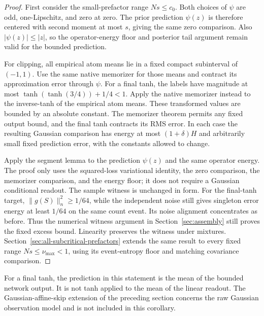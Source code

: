 \begin{proof}
First consider the small-prefactor range $Ns\le c_0$. Both choices of $\psi$ are odd, one-Lipschitz, and zero at zero. The prior prediction $\psi(z)$ is therefore centered with second moment at most $s$, giving the same zero comparison. Also $|\psi(z)|\le|z|$, so the operator-energy floor and posterior tail argument remain valid for the bounded prediction.

For clipping, all empirical atom means lie in a fixed compact subinterval of $(-1,1)$. Use the same native memorizer for those means and contract its approximation error through $\psi$. For a final tanh, the labels have magnitude at most $\tanh(\tanh(3/4))+1/4<1$. Apply the native memorizer instead to the inverse-tanh of the empirical atom means. These transformed values are bounded by an absolute constant. The memorizer theorem permits any fixed output bound, and the final tanh contracts its RMS error. In each case the resulting Gaussian comparison has energy at most $(1+\delta)H$ and arbitrarily small fixed prediction error, with the constants allowed to change.

Apply the segment lemma to the prediction $\psi(z)$ and the same operator energy. The proof only uses the squared-loss variational identity, the zero comparison, the memorizer comparison, and the energy floor; it does not require a Gaussian conditional readout. The sample witness is unchanged in form. For the final-tanh target, $\|g(S)\|_n^2\ge1/64$, while the independent noise still gives singleton error energy at least $1/64$ on the same count event. Its noise alignment concentrates as before. Thus the numerical witness argument in Section~\ref{sec:assembly} still proves the fixed excess bound. Linearity preserves the witness under mixtures. Section~\ref{sec:all-subcritical-prefactors} extends the same result to every fixed range $Ns\le\nu_{\max}<1$, using its event-entropy floor and matching covariance comparison.
\end{proof}

For a final tanh, the prediction in this statement is the mean of the bounded network output. It is not tanh applied to the mean of the linear readout. The Gaussian-affine-skip extension of the preceding section concerns the raw Gaussian observation model and is not included in this corollary.
